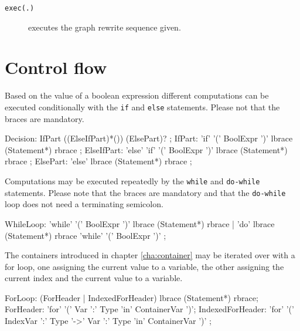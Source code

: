 \begin{description}
\item[\texttt{exec(.)}] executes the graph rewrite sequence given. 
\end{description}

\section{Control flow} \label{sub:controlflow}

Based on the value of a boolean expression different computations can be executed conditionally with the \texttt{if} and \texttt{else} statements. Please not that the braces are mandatory.

\begin{rail} 
  Decision: IfPart ((ElseIfPart)*()) (ElsePart)? ;
	IfPart: 'if' '(' BoolExpr ')' lbrace (Statement*) rbrace ;
	ElseIfPart: 'else' 'if' '(' BoolExpr ')' lbrace (Statement*) rbrace ;
	ElsePart: 'else' lbrace (Statement*) rbrace ;
\end{rail}

Computations may be executed repeatedly by the \texttt{while} and \texttt{do-while} statements. Please note that the braces are mandatory and that the \texttt{do-while} loop does not need a terminating semicolon.

\begin{rail} 
  WhileLoop: 
	'while' '(' BoolExpr ')' lbrace (Statement*) rbrace |
	'do' lbrace (Statement*) rbrace 'while' '(' BoolExpr ')' 
	;
\end{rail}


The containers introduced in chapter \ref{cha:container} may be iterated over with a for loop, one assigning the current value to a variable, the other assigning the current index and the current value to a variable.
\begin{rail}
  ForLoop: (ForHeader | IndexedForHeader) lbrace (Statement*) rbrace;
  ForHeader: 'for' '(' Var ':' Type 'in' ContainerVar ')';
  IndexedForHeader: 'for' '(' IndexVar ':' Type '->' Var ':' Type 'in' ContainerVar ')' ;
\end{rail}


